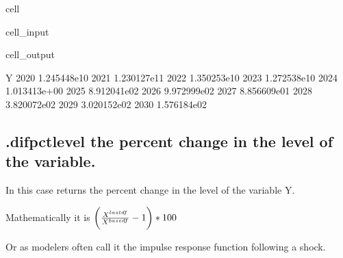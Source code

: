 \documentclass[letterpaper,10pt,english]{jupyterBook}
\begin{document}
\begin{sphinxuseclass}{cell}\begin{sphinxVerbatimInput}

\begin{sphinxuseclass}{cell_input}
\begin{sphinxVerbatim}[commandchars=\\\{\}]
\PYG{p}{[}\PYG{p}{]}
\end{sphinxVerbatim}

\end{sphinxuseclass}\end{sphinxVerbatimInput}
\begin{sphinxVerbatimOutput}

\begin{sphinxuseclass}{cell_output}
\begin{sphinxVerbatim}[commandchars=\\\{\}]
                 Y
2020  1.245448e\PYGZhy{}10
2021  1.230127e\PYGZhy{}11
2022  1.350253e\PYGZhy{}10
2023  1.272538e\PYGZhy{}10
2024  1.013413e+00
2025  8.912041e\PYGZhy{}02
2026  9.972999e\PYGZhy{}02
2027 \PYGZhy{}8.856609e\PYGZhy{}01
2028  3.820072e\PYGZhy{}02
2029  3.020152e\PYGZhy{}02
2030  1.576184e\PYGZhy{}02
\end{sphinxVerbatim}

\end{sphinxuseclass}\end{sphinxVerbatimOutput}

\end{sphinxuseclass}

\subsection{.difpctlevel \sphinxhyphen{} the percent change in the level of the variable.}
\label{\detokenize{content/05_SimpleModel/SimpleModel:difpctlevel-the-percent-change-in-the-level-of-the-variable}}
\sphinxAtStartPar
In this case  returns the percent change in the level of the variable Y.

\sphinxAtStartPar
Mathematically it is \(\bigg( {X^{lastdf}\over X^{basedf}}-1 \bigg)*100\)

\sphinxAtStartPar
Or as modelers often call it the impulse response function following a shock.
\end{document}
